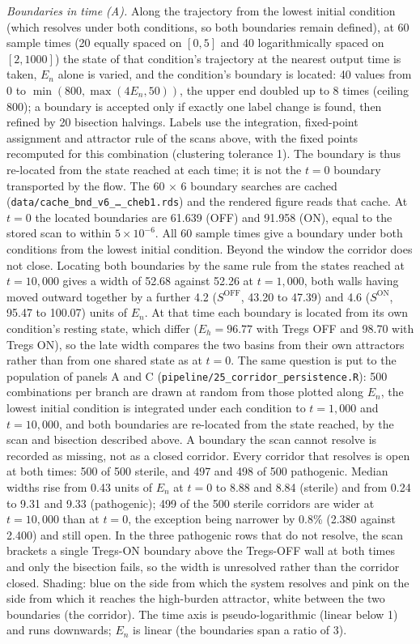 \documentclass[11pt]{article}
\begin{document}
\emph{Boundaries in time (A).} Along the trajectory from the lowest initial condition (which
resolves under both conditions, so both boundaries remain defined), at 60 sample times (20 equally
spaced on $[0,5]$ and 40 logarithmically spaced on $[2, 1000]$) the state of that condition's
trajectory at the nearest output time is taken, $E_n$ alone is varied, and the condition's
boundary is located: 40 values from 0 to $\min(800, \max(4E_n, 50))$, the upper end doubled up to
8 times (ceiling 800); a boundary is accepted only if exactly one label change is found, then
refined by 20 bisection halvings. Labels use the integration, fixed-point assignment and
attractor rule of the scans above, with the fixed points recomputed for this combination
(clustering tolerance 1). The boundary is thus re-located from the state reached at each time; it
is not the $t=0$ boundary transported by the flow. The 60 $\times$ 6 boundary searches are
cached (\texttt{data/cache\_bnd\_v6\_\ldots\_cheb1.rds}) and the rendered figure reads that cache.
At $t=0$ the located boundaries are 61.639 (OFF) and 91.958 (ON), equal to the stored scan to
within $5\times10^{-6}$. All 60 sample times give a boundary under both conditions from the lowest
initial condition. Beyond the window the corridor does not close. Locating both boundaries by
the same rule from the states reached at $t = 10{,}000$ gives a width of 52.68 against 52.26 at
$t = 1{,}000$, both walls having moved outward together by a further
4.2 ($S^{\mathrm{OFF}}$, 43.20 to 47.39) and 4.6 ($S^{\mathrm{ON}}$, 95.47 to 100.07) units of
$E_n$. At that time each boundary is located from its own condition's resting state, which
differ ($E_h = 96.77$ with Tregs OFF and 98.70 with Tregs ON), so the late width compares the two
basins from their own attractors rather than from one shared state as at $t = 0$.
The same question is put to the population of panels A and C
(\texttt{pipeline/25\_corridor\_persistence.R}): 500 combinations per branch are drawn at random
from those plotted along $E_n$, the lowest initial condition is integrated under each condition to
$t = 1{,}000$ and $t = 10{,}000$, and both boundaries are re-located from the state reached, by the
scan and bisection described above. A boundary the scan cannot resolve is recorded as missing, not
as a closed corridor. Every corridor that resolves is open at both times: 500 of 500 sterile, and
497 and 498 of 500 pathogenic. Median widths rise from 0.43 units of $E_n$ at $t = 0$ to 8.88 and
8.84 (sterile) and from 0.24 to 9.31 and 9.33 (pathogenic); 499 of the 500 sterile corridors are
wider at $t = 10{,}000$ than at $t = 0$, the exception being narrower by 0.8\% (2.380 against
2.400) and still open. In the three pathogenic rows that do not resolve, the scan brackets a
single Tregs-ON boundary above the Tregs-OFF wall at both times and only the bisection fails, so
the width is unresolved rather than the corridor closed. Shading: blue on the side from which the system resolves and pink on the side
from which it reaches the high-burden attractor, white between the two boundaries (the
corridor). The time axis is pseudo-logarithmic (linear below 1) and runs downwards; $E_n$ is
linear (the boundaries span a ratio of 3).
\end{document}
